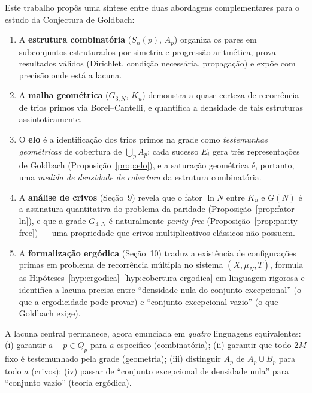 \documentclass[12pt,a4paper]{article}
\theoremstyle{remark}
\begin{document}
	Este trabalho prop\^os uma s\'intese entre duas abordagens complementares para o
	estudo da Conjectura de Goldbach:
	
	\begin{enumerate}
		\item A \textbf{estrutura combinat\'oria} ($S_n(p)$, $A_p$) organiza os pares
		em subconjuntos estruturados por simetria e progress\~ao aritm\'etica,
		prova resultados v\'alidos (Dirichlet, condi\c{c}\~ao necess\'aria, propaga\c{c}\~ao)
		e exp\~oe com precis\~ao onde est\'a a lacuna.
		
		\item A \textbf{malha geom\'etrica} ($G_{3,N}$, $K_u$) demonstra a quase certeza
		de recorr\^encia de trios primos via Borel--Cantelli,
		e quantifica a densidade de tais estruturas assintoticamente.
		
		\item O \textbf{elo} \'e a identifica\c{c}\~ao dos trios primos na grade como
		\emph{testemunhas geom\'etricas} de cobertura de $\bigcup_p A_p$:
		cada sucesso $E_i$ gera tr\^es representa\c{c}\~oes de Goldbach
		(Proposi\c{c}\~ao~\ref{prop:elo}), e a satura\c{c}\~ao geom\'etrica \'e,
		portanto, uma \emph{medida de densidade de cobertura} da estrutura combinat\'oria.
		
		\item A \textbf{an\'alise de crivos} (Se\c{c}\~ao~9) revela que o fator $\ln N$
		entre $K_u$ e $G(N)$ \'e a assinatura quantitativa do problema da paridade
		(Proposi\c{c}\~ao~\ref{prop:fator-ln}), e que a grade $G_{3,N}$ \'e naturalmente
		\emph{parity-free} (Proposi\c{c}\~ao~\ref{prop:parity-free}) --- uma propriedade
		que crivos multiplicativos cl\'assicos n\~ao possuem.
		
		\item A \textbf{formaliza\c{c}\~ao erg\'odica} (Se\c{c}\~ao~10) traduz a exist\^encia
		de configura\c{c}\~oes primas em problema de recorr\^encia m\'ultipla no sistema
		$(X, \mu_N, T)$, formula as Hip\'oteses~\ref{hyp:ergodica}--\ref{hyp:cobertura-ergodica}
		em linguagem rigorosa e identifica a lacuna precisa entre ``densidade nula do conjunto
		excepcional'' (o que a ergodicidade pode provar) e ``conjunto excepcional vazio''
		(o que Goldbach exige).
	\end{enumerate}
	
	A lacuna central permanece, agora enunciada em \emph{quatro} linguagens equivalentes:
	(i) garantir $a-p\in Q_p$ para $a$ espec\'ifico (combinat\'oria);
	(ii) garantir que todo $2M$ fixo \'e testemunhado pela grade (geometria);
	(iii) distinguir $A_p$ de $A_p\cup B_p$ para todo $a$ (crivos);
	(iv) passar de ``conjunto excepcional de densidade nula'' para ``conjunto vazio''
	(teoria erg\'odica).
	
\end{document}
